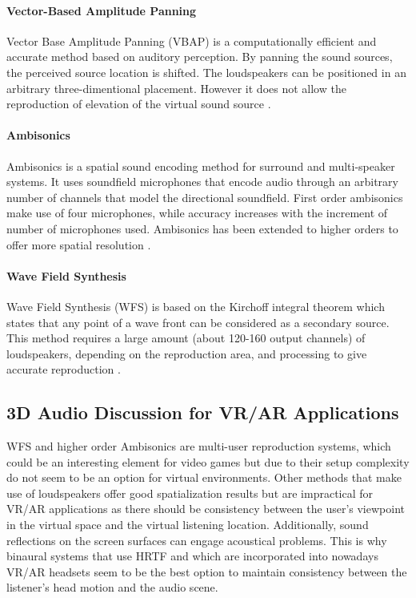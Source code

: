 \paragraph{Vector-Based Amplitude Panning}\label{par:vbap}
\hfill \break

Vector Base Amplitude Panning (\gls{VBAP}) is a computationally efficient and accurate method based on auditory perception. By panning the sound sources, the perceived source location is shifted. The loudspeakers can be positioned in an arbitrary three-dimentional placement. However it does not allow the reproduction of elevation of the virtual sound source \cite{pulkki1997virtual}.

\paragraph{Ambisonics}\label{par:ambisonics}
\hfill \break

Ambisonics is a spatial sound encoding method for surround and multi-speaker systems. It uses soundfield microphones that encode audio through an arbitrary number of channels that model the directional soundfield. First order ambisonics make use of four microphones, while accuracy increases with the increment of number of microphones used.  Ambisonics has been extended to higher orders to offer more spatial resolution \cite{daniel2003further}. 

\paragraph{Wave Field Synthesis}\label{par:wfs}
\hfill \break

Wave Field Synthesis (\gls{WFS}) is based on the Kirchoff integral theorem which states that any point of a wave front can be considered as a secondary source. This method requires a large amount (about 120-160 output channels) of loudspeakers, depending on the reproduction area, and processing to give accurate reproduction \cite{funkhouser2002sounds}.

\subsection{3D Audio Discussion for VR/AR Applications}

\gls{WFS} and higher order Ambisonics are multi-user reproduction systems, which could be an interesting element for video games but due to their setup complexity do not seem to be an option for virtual environments. Other methods that make use of loudspeakers offer good spatialization results but are impractical for \gls{VR}/\gls{AR} applications as there should be consistency between the user's viewpoint in the virtual space and the virtual listening location. Additionally, sound reflections on the screen surfaces can engage acoustical problems. This is why binaural systems that use \gls{HRTF} and which are incorporated into nowadays \gls{VR}/\gls{AR} headsets seem to be the best option to maintain consistency between the listener's head motion and the audio scene.